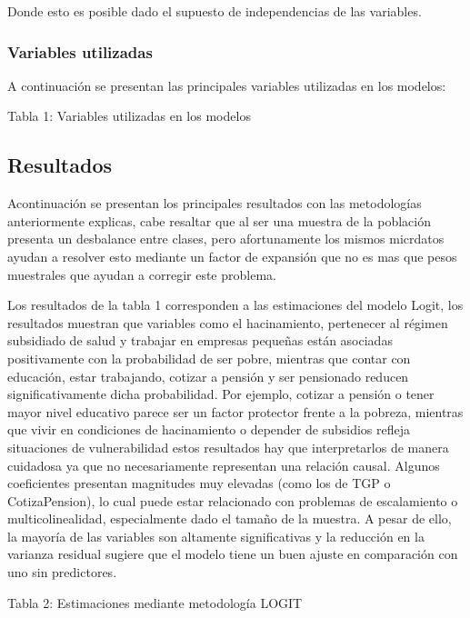 \documentclass[12pt,a4paper,onecolumn]{article}
\begin{document}
Donde esto es posible dado el supuesto de independencias de las variables.

\subsubsection{Variables utilizadas}
A continuación se presentan las principales variables utilizadas en los modelos:

{\color{blue} Tabla 1: Variables utilizadas en los modelos}

\subsection{Resultados}

Acontinuación se presentan los principales resultados con las metodologías anteriormente explicas, cabe resaltar que al ser una muestra de la población presenta un desbalance entre clases, pero afortunamente los mismos micrdatos ayudan a resolver esto mediante un factor de expansión que no es mas que pesos muestrales que ayudan a corregir este problema.

Los resultados de la tabla 1 corresponden a las estimaciones del modelo Logit, los resultados muestran que variables como el hacinamiento, pertenecer al régimen subsidiado de salud y trabajar en empresas pequeñas están asociadas positivamente con la probabilidad de ser pobre, mientras que contar con educación, estar trabajando, cotizar a pensión y ser pensionado reducen significativamente dicha probabilidad. Por ejemplo, cotizar a pensión o tener mayor nivel educativo parece ser un factor protector frente a la pobreza, mientras que vivir en condiciones de hacinamiento o depender de subsidios refleja situaciones de vulnerabilidad estos resultados hay que interpretarlos de manera cuidadosa ya que no necesariamente representan una relación causal. Algunos coeficientes presentan magnitudes muy elevadas (como los de TGP o CotizaPension), lo cual puede estar relacionado con problemas de escalamiento o multicolinealidad, especialmente dado el tamaño de la muestra. A pesar de ello, la mayoría de las variables son altamente significativas y la reducción en la varianza residual sugiere que el modelo tiene un buen ajuste en comparación con uno sin predictores.

{\color{blue} Tabla 2: Estimaciones mediante metodología LOGIT}
\end{document}
